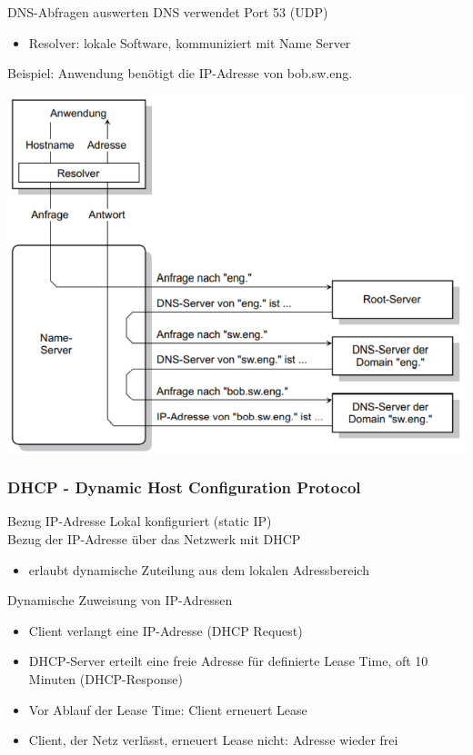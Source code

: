 \begin{example2}{DNS-Abfragen auswerten} DNS verwendet Port 53 (UDP)
    \begin{itemize}
        \item Resolver: lokale Software, kommuniziert mit Name Server 
    \end{itemize}
    Beispiel: Anwendung benötigt die IP-Adresse von bob.sw.eng.\\

        \includegraphics[width=0.9\linewidth]{images/example_dns.png}        
\end{example2}

\columnbreak



\subsubsection{DHCP - Dynamic Host Configuration Protocol}

\begin{definition}{Bezug IP-Adresse} Lokal konfiguriert (static IP)\\
    Bezug der IP-Adresse über das Netzwerk mit DHCP
        \begin{itemize}
            \item erlaubt dynamische Zuteilung aus dem lokalen Adressbereich
        \end{itemize}
\end{definition}

\begin{concept}{Dynamische Zuweisung von IP-Adressen}
    \begin{itemize}
        \item Client verlangt eine IP-Adresse (DHCP Request)
        \item DHCP-Server erteilt eine freie Adresse für definierte Lease Time, oft 10 Minuten (DHCP-Response)
        \item Vor Ablauf der Lease Time: Client erneuert Lease
        \item Client, der Netz verlässt, erneuert Lease nicht: Adresse wieder frei
    \end{itemize}
\end{concept}



